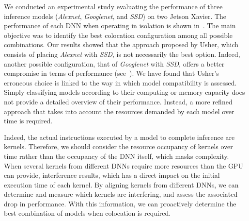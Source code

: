 
We conducted an experimental study evaluating the performance of three inference models (\textit{Alexnet}, \textit{Googlenet}, and \textit{SSD}) on two Jetson Xavier. The performance of each DNN when operating in isolation is shown in~. The main objective was to identify the best colocation configuration among all possible combinations. Our results showed that the approach proposed by Usher, which consists of placing \textit{Alexnet} with \textit{SSD}, is not necessarily the best option. Indeed, another possible configuration, that of \textit{Googlenet} with \textit{SSD}, offers a better compromise in terms of performance (see~).
We have found that Usher's erroneous choice is linked to the way in which model compatibility is assessed. Simply classifying models according to their computing or memory capacity does not provide a detailed overview of their performance. Instead, a more refined approach that takes into account the resources demanded by each model over time is required.

Indeed, the actual instructions executed by a model to complete inference are kernels. Therefore, we should consider the resource occupancy of kernels over time rather than the occupancy of the DNN itself, which masks complexity. When several kernels from different DNNs require more resources than the GPU can provide, interference results, which has a direct impact on the initial execution time of each kernel.
By aligning kernels from different DNNs, we can determine and measure which kernels are interfering, and assess the associated drop in performance. With this information, we can proactively determine the best combination of models when colocation is required.



